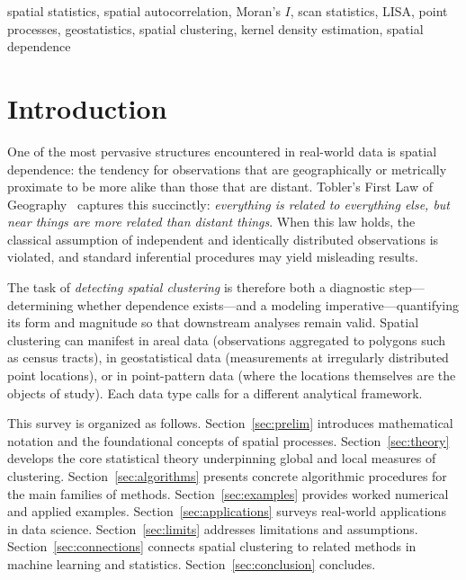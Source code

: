 \documentclass[conference]{IEEEtran}
\theoremstyle{definition}
\begin{document}
\begin{IEEEkeywords}
spatial statistics, spatial autocorrelation, Moran's $I$, scan statistics, LISA, point processes, geostatistics, spatial clustering, kernel density estimation, spatial dependence
\end{IEEEkeywords}

\section{Introduction}

One of the most pervasive structures encountered in real-world data is spatial dependence: the tendency for observations that are geographically or metrically proximate to be more alike than those that are distant. Tobler's First Law of Geography~\cite{tobler1970} captures this succinctly: \emph{everything is related to everything else, but near things are more related than distant things}. When this law holds, the classical assumption of independent and identically distributed observations is violated, and standard inferential procedures may yield misleading results.

The task of \emph{detecting spatial clustering} is therefore both a diagnostic step---determining whether dependence exists---and a modeling imperative---quantifying its form and magnitude so that downstream analyses remain valid. Spatial clustering can manifest in areal data (observations aggregated to polygons such as census tracts), in geostatistical data (measurements at irregularly distributed point locations), or in point-pattern data (where the locations themselves are the objects of study). Each data type calls for a different analytical framework.

This survey is organized as follows. Section~\ref{sec:prelim} introduces mathematical notation and the foundational concepts of spatial processes. Section~\ref{sec:theory} develops the core statistical theory underpinning global and local measures of clustering. Section~\ref{sec:algorithms} presents concrete algorithmic procedures for the main families of methods. Section~\ref{sec:examples} provides worked numerical and applied examples. Section~\ref{sec:applications} surveys real-world applications in data science. Section~\ref{sec:limits} addresses limitations and assumptions. Section~\ref{sec:connections} connects spatial clustering to related methods in machine learning and statistics. Section~\ref{sec:conclusion} concludes.
\end{document}
